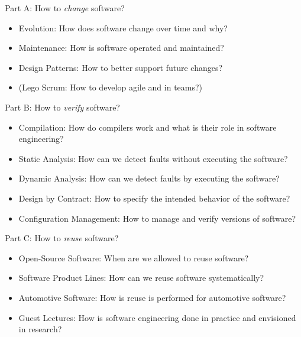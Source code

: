 \begin{frame}{\myframetitle{}}
	\small
	\begin{fancycolumns}[columns=3,t]
		\begin{definition}{Part A: How to \emph{change} software?}
			\begin{itemize}
				\item Evolution: How does software change over time and why?
				\item Maintenance: How is software operated and maintained?
				\item Design Patterns: How to better support future changes?
				\item (Lego Scrum: How to develop agile and in teams?)
			\end{itemize}
		\end{definition}
	\nextcolumn
		\begin{definition}{Part B: How to \emph{verify} software?}
			\begin{itemize}
				\item Compilation: How do compilers work and what is their role in software engineering?
				\item Static Analysis: How can we detect faults without executing the software?
				\item Dynamic Analysis: How can we detect faults by executing the software?
				\item Design by Contract: How to specify the intended behavior of the software?
				\item Configuration Management: How to manage and verify versions of software?
			\end{itemize}
		\end{definition}
	\nextcolumn
		\begin{definition}{Part C: How to \emph{reuse} software?}
			\begin{itemize}
				\item Open-Source Software: When are we allowed to reuse software?
				\item Software Product Lines: How can we reuse software systematically?
				\item Automotive Software: How is reuse is performed for automotive software?
				\item Guest Lectures: How is software engineering done in practice and envisioned in research?
			\end{itemize}
		\end{definition}
	\end{fancycolumns}
\end{frame}

